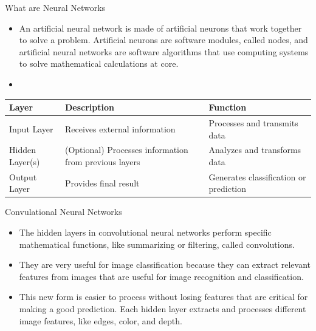 \documentclass{beamer}
\begin{document}
\begin{frame}{What are Neural Networks }
  \begin{itemize}
    \item An artificial neural network is made of artificial neurons that work together to solve a problem. Artificial neurons are software modules, called nodes, and artificial neural networks are software algorithms that use computing systems to solve mathematical calculations at core. 
    \item{}
    
 \end{itemize} 
\begin{tabular}{lll}
\textbf{Layer} & \textbf{Description} & \textbf{Function} \\ \hline
Input Layer & Receives external information  & Processes and transmits data \\
Hidden Layer(s) & (Optional) Processes information from previous layers  & Analyzes and transforms data \\
Output Layer & Provides final result  & Generates classification or prediction
\end{tabular}

\end{frame}
\begin{frame}{Convulational Neural Networks}
  \begin{itemize}
    \item The hidden layers in convolutional neural networks perform specific mathematical functions, like summarizing or filtering, called convolutions. 
    \item They are very useful for image classification because they can extract relevant features from images that are useful for image recognition and classification. 
    \item This new form is easier to process without losing features that are critical for making a good prediction. Each hidden layer extracts and processes different image features, like edges, color, and depth.
    
    
  \end{itemize}
\end{frame}
\end{document}
